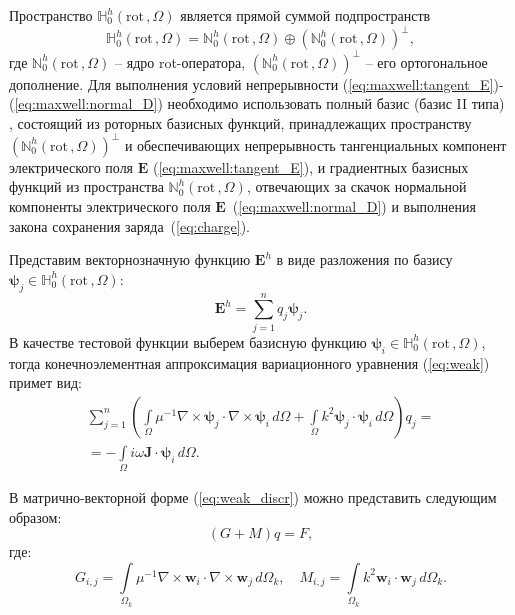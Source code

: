 \documentclass[a4paper,14pt]{article}
\begin{document}
Пространство $\mathbb{H}_{0}^h( \mathrm{rot}\,, \Omega )$ является прямой суммой подпространств~\citep{hiptmair}
\begin{equation*}
	\mathbb{H}_{0}^h( \mathrm{rot}\,, \Omega ) = \mathbb{N}_{0}^h( \mathrm{rot}\,, \Omega ) \oplus (\mathbb{N}_{0}^h( \mathrm{rot}\,, \Omega ))^{\bot} ,
\end{equation*}
где $\mathbb{N}_{0}^h( \mathrm{rot}\,, \Omega )$ – ядро rot-оператора, $(\mathbb{N}_{0}^h( \mathrm{rot}\,, \Omega ))^{\bot}$ – его ортогональное дополнение. Для выполнения условий непрерывности (\ref{eq:maxwell:tangent_E})-(\ref{eq:maxwell:normal_D}) необходимо использовать полный базис (базис II типа) \citep{webb1993,webb1999,nedelec1980,nedelec1986}, состоящий из роторных базисных функций, принадлежащих пространству $(\mathbb{N}_{0}^h( \mathrm{rot}\,, \Omega ))^{\bot}$ и обеспечивающих непрерывность тангенциальных компонент электрического поля $\mathbf{E}$ (\ref{eq:maxwell:tangent_E}), и градиентных базисных функций из пространства $\mathbb{N}_{0}^h( \mathrm{rot}\,, \Omega )$, отвечающих за скачок нормальной компоненты электрического поля $\mathbf{E}$~(\ref{eq:maxwell:normal_D}) и выполнения закона сохранения заряда~(\ref{eq:charge}).

Представим векторнозначную функцию $\mathbf{E}^h$ в виде разложения по базису \linebreak $\boldsymbol{\psi}_j \in \mathbb{H}_{0}^h( \mathrm{rot}\,, \Omega )$:
\begin{equation*}
	\mathbf{E}^h = \sum\limits_{j = 1}^n q_j \boldsymbol{\psi}_j .
\end{equation*}
В качестве тестовой функции выберем базисную функцию $\boldsymbol{\psi}_i \in \mathbb{H}_{0}^h( \mathrm{rot}\,, \Omega )$, тогда конечноэлементная аппроксимация вариационного уравнения (\ref{eq:weak}) примет вид:
\begin{equation}
	\begin{array}{c} { \displaystyle
		\sum\limits_{j = 1}^n \left( \int\limits_\Omega \mu^{-1} \nabla \times \boldsymbol{\psi}_j \cdot \nabla \times \boldsymbol{\psi}_i \,d\Omega + \int\limits_\Omega k^{2} \boldsymbol{\psi}_j \cdot \boldsymbol{\psi}_i \,d\Omega \right) q_j =
	} \\ { \displaystyle
		=  - \int\limits_\Omega i \omega \mathbf{J} \cdot \boldsymbol{\psi}_i \,d\Omega .
	} \end{array}
	\label{eq:weak_discr}
\end{equation}

В матрично-векторной форме (\ref{eq:weak_discr}) можно представить следующим образом:
\begin{equation}
	( G + M )q = F , \label{eq:form_29}
\end{equation}
где:
\begin{equation*}
	G_{ i,j } = \int\limits_{\Omega_k} \mu^{-1} \nabla \times \mathbf{w}_i \cdot \nabla \times \mathbf{w}_j \,d\Omega_k , \text{~~~}
	M_{ i,j } = \int\limits_{\Omega_k} k^2 \mathbf{w}_i \cdot \mathbf{w}_j \,d\Omega_k . \label{eq:local_matrixes}
\end{equation*}
\end{document}
